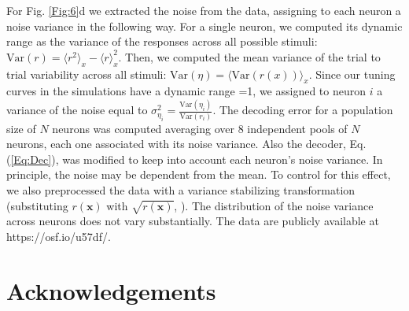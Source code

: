 \documentclass[a4paper]{article}%
\begin{document}
For Fig. \ref{Fig:6}d we extracted the noise from the data, assigning to each
neuron a noise variance in the following way. For a single neuron, we computed
its dynamic range as the variance of the responses across all possible
stimuli: $\text{Var}(r) = \langle r^{2} \rangle_{x} - \langle r\rangle^{2}%
_{x}$. Then, we computed the mean variance of the trial to trial variability
across all stimuli: $\text{Var}(\eta) = \langle\text{Var}(r(x))\rangle_{x}$.
Since our tuning curves in the simulations have a dynamic range =1, we
assigned to neuron $i$ a variance of the noise equal to $\sigma_{\eta_{i}}^{2}
= \frac{\text{Var}(\eta_{i})}{\text{Var}(r_{i})}$. The decoding error for a
population size of $N$ neurons was computed averaging over 8 independent pools
of $N$ neurons, each one associated with its noise variance. Also the decoder,
Eq.(\ref{Eq:Dec}), was modified to keep into account each neuron's noise
variance. In principle, the noise may be dependent from the mean. To control
for this effect, we also preprocessed the data with a variance stabilizing
transformation (substituting $r(\mathbf{x}) $ with $\sqrt{r(\mathbf{x})}$,
\cite{SRJ1999TheStatistics}). The distribution of the noise variance across
neurons does not vary substantially. The data are publicly available at https://osf.io/u57df/.

\section{Acknowledgements}
\end{document}
